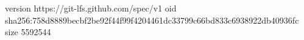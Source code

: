 version https://git-lfs.github.com/spec/v1
oid sha256:758d8889becbf2be92f44f99f4204461dc33799c66bd833c6938922db40936fc
size 5592544
